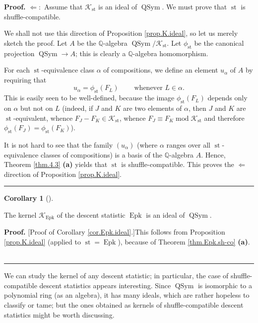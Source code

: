 \documentclass[numbers=enddot,12pt,final,onecolumn,notitlepage]{scrartcl}%
\theoremstyle{definition}
\newtheorem{coro}[theo]{Corollary}
\newenvironment{corollary}[1][]
{\begin{coro}[#1]\begin{leftbar}}
{\end{leftbar}\end{coro}}
\newenvironment{proof}[1][Proof]{\noindent\textbf{#1.} }{\ \rule{0.5em}{0.5em}}
\begin{document}
\begin{proof}
$\Longleftarrow:$ Assume that $\mathcal{K}_{\operatorname*{st}}$ is an ideal
of $\operatorname*{QSym}$. We must prove that $\operatorname*{st}$ is shuffle-compatible.

We shall not use this direction of Proposition \ref{prop.K.ideal}, so let us
merely sketch the proof. Let $A$ be the $\mathbb{Q}$-algebra
$\operatorname*{QSym}/\mathcal{K}_{\operatorname*{st}}$. Let $\phi
_{\operatorname*{st}}$ be the canonical projection $\operatorname*{QSym}%
\rightarrow A$; this is clearly a $\mathbb{Q}$-algebra homomorphism.

For each $\operatorname*{st}$-equivalence class $\alpha$ of compositions, we
define an element $u_{\alpha}$ of $A$ by requiring that%
\[
u_{\alpha}=\phi_{\operatorname*{st}}\left(  F_{L}\right)
\ \ \ \ \ \ \ \ \ \ \text{whenever }L\in\alpha.
\]
This is easily seen to be well-defined, because the image $\phi
_{\operatorname*{st}}\left(  F_{L}\right)  $ depends only on $\alpha$ but not
on $L$ (indeed, if $J$ and $K$ are two elements of $\alpha$, then $J$ and $K$
are $\operatorname*{st}$-equivalent, whence $F_{J}-F_{K}\in\mathcal{K}%
_{\operatorname*{st}}$, whence $F_{J}\equiv F_{K}\operatorname{mod}%
\mathcal{K}_{\operatorname*{st}}$ and therefore $\phi_{\operatorname*{st}%
}\left(  F_{J}\right)  =\phi_{\operatorname*{st}}\left(  F_{K}\right)  $).

It is not hard to see that the family $\left(  u_{\alpha}\right)  $ (where
$\alpha$ ranges over all $\operatorname*{st}$-equivalence classes of
compositions) is a basis of the $\mathbb{Q}$-algebra $A$. Hence, Theorem
\ref{thm.4.3} \textbf{(a)} yields that $\operatorname*{st}$ is
shuffle-compatible. This proves the $\Longleftarrow$ direction of Proposition
\ref{prop.K.ideal}.
\end{proof}

\begin{corollary}
\label{cor.Epk.ideal}The kernel $\mathcal{K}_{\operatorname*{Epk}}$ of the
descent statistic $\operatorname*{Epk}$ is an ideal of $\operatorname*{QSym}$.
\end{corollary}

\begin{proof}
[Proof of Corollary \ref{cor.Epk.ideal}.]This follows from Proposition
\ref{prop.K.ideal} (applied to $\operatorname*{st}=\operatorname*{Epk}$),
because of Theorem \ref{thm.Epk.sh-co} \textbf{(a)}.
\end{proof}

We can study the kernel of any descent statistic; in particular, the case of
shuffle-compatible descent statistics appears interesting. Since
$\operatorname*{QSym}$ is isomorphic to a polynomial ring (as an algebra), it
has many ideals, which are rather hopeless to classify or tame; but the ones
obtained as kernels of shuffle-compatible descent statistics might be worth discussing.
\end{document}
